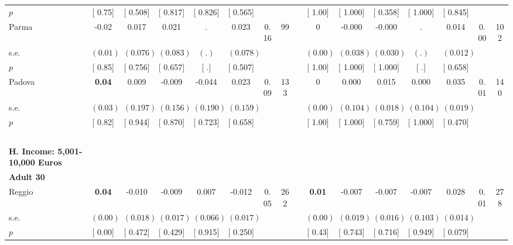\begin{longtable}{L{8em} c c c c c c c p{1em} c c c c c c c}
\quad \quad \quad \quad $ p$ & [     0.75] & [    0.508] & [    0.817] & [    0.826] & [    0.565] & & & & [     1.00] & [    1.000] & [    0.358] & [    1.000] & [    0.845] & &  \\[1em]
\quad \quad \quad Parma& -0.02 &     0.017 &     0.021 &         . &     0.023 &      0.16 &        99 & & 0 &    -0.000 &    -0.000 &         . &     0.014 &      0.00 &       102  \\*
\quad \quad \quad \quad s.e.& $ (     0.01)$ & $ (    0.076)$ & $ (    0.083)$ & $ (        .)$ & $ (    0.078)$ & & & & $ (     0.00)$ & $ (    0.038)$ & $ (    0.030)$ & $ (        .)$ & $ (    0.012)$ & &  \\*
\quad \quad \quad \quad $ p$ & [     0.85] & [    0.756] & [    0.657] & [        .] & [    0.507] & & & & [     1.00] & [    1.000] & [    1.000] & [        .] & [    0.658] & &  \\[1em]
\quad \quad \quad Padova& \textbf{     0.04} &     0.009 &    -0.009 &    -0.044 &     0.023 &      0.09 &       133 & & 0 &     0.000 &     0.015 &     0.000 &     0.035 &      0.01 &       140  \\*
\quad \quad \quad \quad s.e.& $ (     0.03)$ & $ (    0.197)$ & $ (    0.156)$ & $ (    0.190)$ & $ (    0.159)$ & & & & $ (     0.00)$ & $ (    0.104)$ & $ (    0.018)$ & $ (    0.104)$ & $ (    0.019)$ & &  \\*
\quad \quad \quad \quad $ p$ & [     0.82] & [    0.944] & [    0.870] & [    0.723] & [    0.658] & & & & [     1.00] & [    1.000] & [    0.759] & [    1.000] & [    0.470] & &  \\[1em]
~\\[1em]
\textbf{H. Income: 5,001-10,000 Euros} \\*
\quad \quad \textbf{Adult 30} & & & & & & & & & & & & & & & \\* 
\quad \quad \quad Reggio& \textbf{     0.04} &    -0.010 &    -0.009 &     0.007 &    -0.012 &      0.05 &       262 & & \textbf{     0.01} &    -0.007 &    -0.007 &    -0.007 & $ \mathbf{    0.028}$ &      0.01 &       278  \\*
\quad \quad \quad \quad s.e.& $ (     0.00)$ & $ (    0.018)$ & $ (    0.017)$ & $ (    0.066)$ & $ (    0.017)$ & & & & $ (     0.00)$ & $ (    0.019)$ & $ (    0.016)$ & $ (    0.103)$ & $ (    0.014)$ & &  \\*
\quad \quad \quad \quad $ p$ & [     0.00] & [    0.472] & [    0.429] & [    0.915] & [    0.250] & & & & [     0.43] & [    0.743] & [    0.716] & [    0.949] & [    0.079] & &  \\[1em]

\end{longtable}
